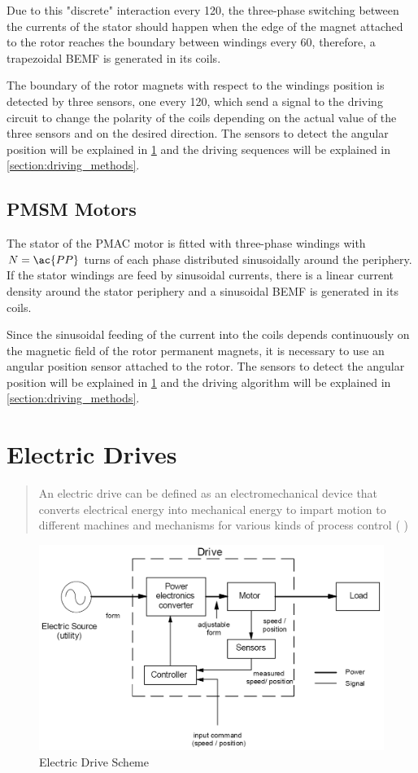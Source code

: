 Due to this "discrete" interaction every 120\degree, the three-phase switching between the currents of the stator should happen when the edge of the magnet attached to the rotor reaches the boundary between windings every 60\degree, therefore, a trapezoidal \ac{BEMF} is generated in its coils.

The boundary of the rotor magnets with respect to the windings position is detected by three sensors, one every 120\degree, which send a signal to the driving circuit to change the polarity of the coils depending on the actual value of the three sensors and on the desired direction. The sensors to detect the angular position will be explained in \ref{section:drives} and the driving sequences will be explained in \ref{section:driving_methods}.


\subsection{PMSM Motors}

The stator of the \ac{PMAC} motor is fitted with three-phase windings with $N=\ac{PP}$ turns of each phase distributed sinusoidally around the periphery. If the stator windings are feed by sinusoidal currents, there is a linear current density around the stator periphery and a sinusoidal \ac{BEMF} is generated in its coils.

Since the sinusoidal feeding of the current into the coils depends continuously on the magnetic field of the rotor permanent magnets, it is necessary to use an angular position sensor attached to the rotor. The sensors to detect the angular position will be explained in \ref{section:drives} and the driving algorithm will be explained in \ref{section:driving_methods}.

\section{Electric Drives}\label{section:drives}

\blockquote{An electric drive can be defined as an electromechanical device that converts electrical energy into mechanical energy to impart motion to different machines and mechanisms for various kinds of process control (\citeauthor{GhioniElecDrives} )}.

\begin{figure}[htbp]
	\centering
	\includegraphics[width=12cm]{Images/electric_drive.png} 
	\caption[Electric Drive Scheme]{Electric Drive Scheme}
	\label{fig:drive}
\end{figure}

